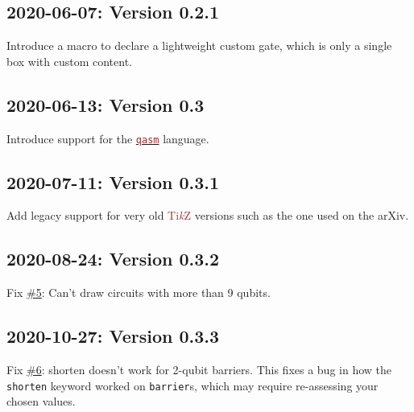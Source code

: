 \documentclass{scrartcl}
\def\TikZ{\textcolor{brown}{Ti\textit kZ}}
\def\pkg#1{\textcolor{brown}{\texttt{#1}}}
\def\langlink#1{\hyperref[sec:foreign:#1]{\pkg{#1}}}
\def\ttlink{\link\texttt}
\begin{document}
      \subsection*{2020-06-07: Version 0.2.1}
         Introduce a macro to declare a lightweight custom gate, which is only a single box with custom content.

      \subsection*{2020-06-13: Version 0.3}
         Introduce support for the \langlink{qasm} language.

      \subsection*{2020-07-11: Version 0.3.1}
         Add legacy support for very old \TikZ{} versions such as the one used on the arXiv.

      \subsection*{2020-08-24: Version 0.3.2}
         Fix \href{https://github.com/projekter/yquant/issues/5}{\#5}: Can't draw circuits with more than 9 qubits.

      \subsection*{2020-10-27: Version 0.3.3}
         Fix \href{https://github.com/projekter/yquant/issues/6}{\#6}: shorten doesn't work for 2-qubit barriers. This fixes a bug in how the \texttt{shorten} keyword worked on \ttlink{barrier}s, which may require re\hyp assessing your chosen values.
\end{document}
